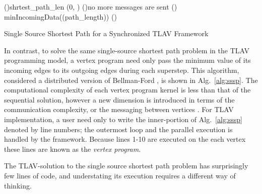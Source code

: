 \documentclass[reprint,twocolumn,showpacs,preprintnumbers,amsmath, aps,pre,amssymb]{revtex4-1}
\begin{document}
\begin{algorithm*}[t]
\small{
\SetAlgoNoLine
    \BlankLine
    \lForEach(){}{shrtest\_path\_len}
    \send(0, )
    \Repeat(){no more messages are sent}{
        \Indp\ForPar(){}{
            \LinesNumbered
            \Indp{}
            minIncomingData(\receive(path\_length))\;
            \halt()\;
        }
    }
 \caption{Single Source Shortest Path for a Synchronized TLAV Framework}
 \label{alg:sssp}
 }
\end{algorithm*}

In contrast, to solve the same single-source shortest path problem in the TLAV programming model, a vertex program need only pass the minimum value of its incoming edges to its outgoing edges during each superstep. This algorithm, considered a distributed version of Bellman-Ford \cite{Lynch1996}, is shown in Alg.~\ref{alg:sssp}.  The computational complexity of each vertex program kernel is less than that of the sequential solution, however a new dimension is introduced in terms of the communication complexity, or the messaging between vertices \cite{Lynch1996}.  For TLAV implementation, a user need only to write the inner-portion of Alg.~\ref{alg:sssp} denoted by line numbers; the outermost loop and the parallel execution is handled by the framework. Because lines 1-10 are executed on the each vertex these lines are known as the \emph{vertex program}.

The TLAV-solution to the single source shortest path problem has surprisingly few lines of code, and understating its execution requires a different way of thinking.  
\end{document}
